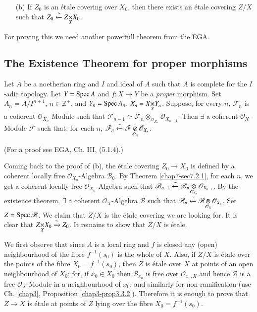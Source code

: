 \begin{itemize}
\item[(b)] If $Z_{0}$ is an \'etale covering over $X_{0}$, then there
  exists an \'etale covering $Z/X$ such that
  $Z_{0}\xleftarrow{\sim}\fprod{Z}{X_{0}}{X}$. 
\end{itemize}

For proving this we need another powerfull theorem from the EGA.

\setcounter{subsection}{3}
\subsection{The Existence Theorem for proper
  morphisms}\label{chap8-sec8.1.4}

Let $A$ be a noe\-therian ring and $I$ and ideal of $A$ such that $A$ is
complete for the $I$-adic topology. Let $Y=\operatorname{Spec} A$ and $f:X\to Y$ be
a {\em proper} morphism. Set $A_{n}=A/I^{n+1}$, $n\in \mathbb{Z}^{+}$,
and $Y_{n}=\operatorname{Spec} A_{n}$, $X_{n}=\fprod{X}{Y_{n}}{Y}$. Suppose, for
every $n$, $\mathscr{F}_{n}$ is a coherent
$\mathscr{O}_{X_{n}}$-Module such that $\mathscr{F}_{n-1}\simeq
\displaystyle\mathscr{F}_{n}\mathop{\otimes}_{\mathscr{O}_{X_{n}}}\mathscr{O}_{X_{n-1}}$. Then
$\exists$ a coherent $\mathscr{O}_{X}$-Module $\mathscr{F}$ such that,
for each $n$,
$\mathscr{F}_{n}\xleftarrow{\sim}\foprod{\mathscr{F}}{\mathscr{O}_{X_{n}}}{\mathscr{O}_{X}}$. 

(For a proof see EGA, Ch. III, (5.1.4).)

Coming back to the proof of (b), the \'etale covering $Z_{0}\to X_{0}$
is defined by a coherent locally free $\mathscr{O}_{X_{0}}$-Algebra
$\mathscr{B}_{0}$. By Theorem \ref{chap7-sec7.2.1}, for each $n$, we get a
coherent locally free $\mathscr{O}_{X_{n}}$-Algebra such that
$\mathscr{B}_{n-1}\xleftarrow{\sim}
\foprod{\mathscr{B}_{n}}{\mathscr{O}_{X_{n-1}}}{\mathscr{O}_{X_{n}}}$. By
the existence theorem, $\exists$ a coherent $\mathscr{O}_{X}$-Algebra
$\mathscr{B}$ such that
$\mathscr{B}_{n}\xleftarrow{\sim}\foprod{\mathscr{B}}{\mathscr{O}_{X_{n}}}{\mathscr{O}_{X}}$. Set\pageoriginale
$Z=\operatorname{Spec}\mathscr{B}$. We claim that $Z/X$ is the \'etale covering we
are looking for. It is clear that
$\fprod{Z}{X_{0}}{X}\xrightarrow{\sim}Z_{0}$. It remains to show that
$Z/X$ is \'etale. 

We first observe that since $A$ is a local ring and $f$ is closed any
(open) neighbourhood of the fibre $f^{-1}(s_{0})$ is the whole of
$X$. Also, if $Z/X$ is \'etale over the points of the fibre
$X_{0}=f^{-1}(s_{0})$, then $Z$ is \'etale over $X$ at points of an
open neighbourhood of $X_{0}$; for, if $x_{0}\in X_{0}$ then
$\mathscr{B}_{x_{0}}$ is free over $\mathscr{O}_{x_{0},X}$ and hence
$\mathscr{B}$ is a free $\mathscr{O}_{X}$-Module in a neighbourhood of
$x_{0}$; and similarly for non-ramification (use Ch. \ref{chap3}, Proposition
\ref{chap3-prop3.3.2}). Therefore it is enough to prove that $Z\to X$ is
\'etale at points of $Z$ lying over the fibre $X_{0}=f^{-1}(s_{0})$.

